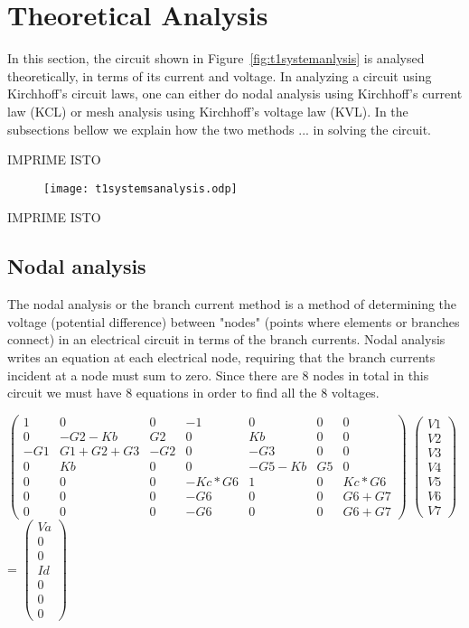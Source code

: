 \section{Theoretical Analysis}
\label{sec:analysis}

In this section, the circuit shown in Figure~\ref{fig:t1systemanlysis} is analysed
theoretically, in terms of its current and voltage.
In analyzing a circuit using Kirchhoff's circuit laws, one can either do nodal analysis using Kirchhoff's current law (KCL) or mesh analysis using Kirchhoff's voltage law (KVL).
In the subsections bellow we explain how the two methods ... in solving the circuit. 



IMPRIME ISTO

\begin{center}
\begin{figure}
\texttt{[image: t1systemsanalysis.odp]}
\end{figure}
\end{center}

IMPRIME ISTO


\subsection{Nodal analysis}
The nodal analysis or the branch current method is a method of determining the voltage (potential difference) between "nodes" (points where elements or branches connect) in an electrical circuit in terms of the branch currents. 
Nodal analysis writes an equation at each electrical node, requiring that the branch currents incident at a node must sum to zero.
Since there are 8 nodes in total in this circuit we must have 8 equations in order to find all the 8 voltages.


$\begin{pmatrix}
1 & 0 & 0 & -1 & 0 & 0 & 0 \\
0 & -G2-Kb & G2 & 0 & Kb & 0 & 0 \\
-G1 & G1+G2+G3 & -G2 & 0 & -G3 & 0 & 0 \\
0 & Kb & 0 & 0 & -G5-Kb & G5 & 0 \\
0 & 0 & 0 & -Kc*G6 & 1 & 0 & Kc*G6 \\
0 & 0 & 0 & -G6 & 0 & 0 & G6+G7 \\
0 & 0 & 0 & -G6 & 0 & 0 & G6+G7 
\end{pmatrix}$
$\begin{pmatrix}
V1\\
V2\\
V3\\
V4\\
V5\\
V6\\
V7
\end{pmatrix}$
=
$\begin{pmatrix}
Va\\
0\\
0\\
Id\\
0\\
0\\
0
\end{pmatrix}$


